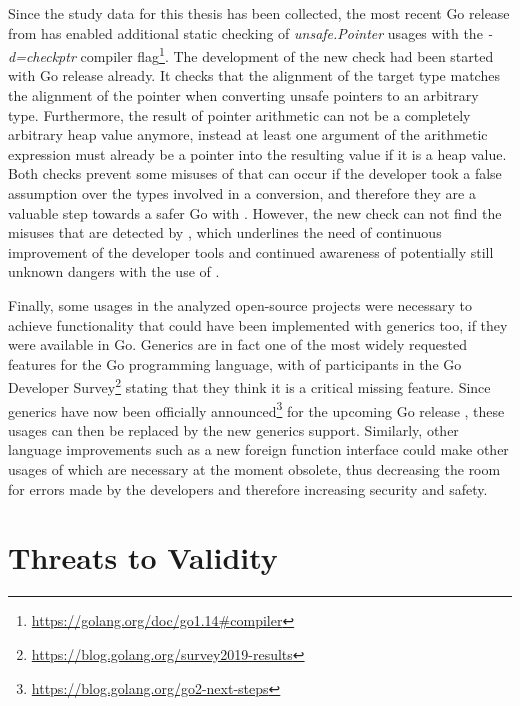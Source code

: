 Since the study data for this thesis has been collected, the most recent Go release  from
 has enabled additional static checking of \textit{unsafe.Pointer} usages with the
\textit{-d=checkptr} compiler flag\footnote{\url{https://golang.org/doc/go1.14\#compiler}}.
The development of the new check had been started with Go release  already.
It checks that the alignment of the target type matches the alignment of the pointer when converting unsafe pointers to
an arbitrary type.
Furthermore, the result of pointer arithmetic can not be a completely arbitrary heap value anymore, instead at least one
argument of the arithmetic expression must already be a pointer into the resulting value if it is a heap value.
Both checks prevent some misuses of \unsafe{} that can occur if the developer took a false assumption over the types
involved in a conversion, and therefore they are a valuable step towards a safer Go with \unsafe{}.
However, the new check can not find the misuses that are detected by \toolSafer{}, which underlines the need of
continuous improvement of the developer tools and continued awareness of potentially still unknown dangers with the use
of \unsafe{}.

Finally, some \unsafe{} usages in the analyzed open-source projects were necessary to achieve functionality that could
have been implemented with generics too, if they were available in Go.
Generics are in fact one of the most widely requested features for the Go programming language, with  of
participants in the  Go Developer Survey\footnote{\url{https://blog.golang.org/survey2019-results}}
stating that they think it is a critical missing feature.
Since generics have now been officially announced\footnote{\url{https://blog.golang.org/go2-next-steps}} for the
upcoming Go release , these \unsafe{} usages can then be replaced by the new generics support.
Similarly, other language improvements such as a new foreign function interface could make other usages of \unsafe{}
which are necessary at the moment obsolete, thus decreasing the room for errors made by the developers and therefore
increasing security and safety.



\section{Threats to Validity}\label{sec:discussion:threats-to-validity}

